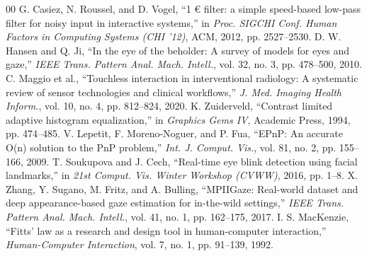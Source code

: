 \documentclass[conference]{IEEEtran}
\begin{document}
\begin{thebibliography}{00}
 G. Casiez, N. Roussel, and D. Vogel, ``1 € filter: a simple speed-based low-pass filter for noisy input in interactive systems,'' in \textit{Proc. SIGCHI Conf. Human Factors in Computing Systems (CHI '12)}, ACM, 2012, pp. 2527--2530.
 D. W. Hansen and Q. Ji, ``In the eye of the beholder: A survey of models for eyes and gaze,'' \textit{IEEE Trans. Pattern Anal. Mach. Intell.}, vol. 32, no. 3, pp. 478--500, 2010.
 C. Maggio et al., ``Touchless interaction in interventional radiology: A systematic review of sensor technologies and clinical workflows,'' \textit{J. Med. Imaging Health Inform.}, vol. 10, no. 4, pp. 812--824, 2020.
 K. Zuiderveld, ``Contrast limited adaptive histogram equalization,'' in \textit{Graphics Gems IV}, Academic Press, 1994, pp. 474--485.
 V. Lepetit, F. Moreno-Noguer, and P. Fua, ``EPnP: An accurate O(n) solution to the PnP problem,'' \textit{Int. J. Comput. Vis.}, vol. 81, no. 2, pp. 155--166, 2009.
 T. Soukupova and J. Cech, ``Real-time eye blink detection using facial landmarks,'' in \textit{21st Comput. Vis. Winter Workshop (CVWW)}, 2016, pp. 1--8.
 X. Zhang, Y. Sugano, M. Fritz, and A. Bulling, ``MPIIGaze: Real-world dataset and deep appearance-based gaze estimation for in-the-wild settings,'' \textit{IEEE Trans. Pattern Anal. Mach. Intell.}, vol. 41, no. 1, pp. 162--175, 2017.
 I. S. MacKenzie, ``Fitts' law as a research and design tool in human-computer interaction,'' \textit{Human-Computer Interaction}, vol. 7, no. 1, pp. 91--139, 1992.
\end{thebibliography}
\end{document}
